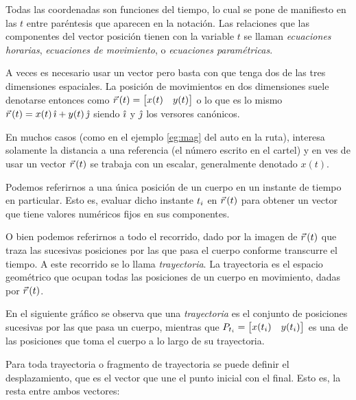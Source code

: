 \documentclass[a5paper,12pt,twoside]{book}
\begin{document}
Todas las coordenadas son funciones del tiempo, lo cual se pone de manifiesto en las $t$ entre paréntesis que aparecen en la notación.
Las relaciones que las componentes del vector posición tienen con la variable $t$ se llaman \emph{ecuaciones horarias}, \emph{ecuaciones de movimiento}, o \emph{ecuaciones paramétricas}.

A veces es necesario usar un vector pero basta con que tenga dos de las tres dimensiones espaciales. La posición de movimientos en dos dimensiones suele denotarse entonces como $\vec{r}\hspace{0.05cm}(t)={ \begin{bmatrix} x(t)&y(t) \end{bmatrix} }$ o lo que es lo mismo $\vec{r}\hspace{0.05cm}(t)=x(t)\,\hat{\imath} + y(t)\,\hat{\jmath}$ siendo $\hat{\imath}$ y $\hat{\jmath}$ los versores canónicos.

En muchos casos (como en el ejemplo \ref{eg:mag} del auto en la ruta), interesa solamente la distancia a una referencia (el número escrito en el cartel) y en ves de usar un vector $\vec{r}\hspace{0.05cm}(t)$ se trabaja con un escalar, generalmente denotado $x(t)$.

Podemos referirnos a una única posición de un cuerpo en un instante de tiempo en particular. Esto es, evaluar dicho instante $t_i$ en $\vec{r}\hspace{0.05cm}(t)$ para obtener un vector que tiene valores numéricos fijos en sus componentes.

O bien podemos referirnos a todo el recorrido, dado por la imagen de $\vec{r}\hspace{0.05cm}(t)$ que traza las sucesivas posiciones por las que pasa el cuerpo conforme transcurre el tiempo. A este recorrido se lo llama \emph{trayectoria}. La trayectoria es el espacio geométrico que ocupan todas las posiciones de un cuerpo en movimiento, dadas por $\vec{r}\hspace{0.05cm}(t)$.

En el siguiente gráfico se observa que una \emph{trayectoria} es el conjunto de posiciones sucesivas por las que pasa un cuerpo, mientras que $P_{t_i}={ \begin{bmatrix} x(t_i)&y(t_i) \end{bmatrix} }$ es una de las posiciones que toma el cuerpo a lo largo de su trayectoria.

\begin{center}
    \vspace{-6cm}
    \def\svgwidth{\linewidth}
    
    \vspace{-6cm}
\end{center}  

Para toda trayectoria o fragmento de trayectoria se puede definir el desplazamiento, que es el vector que une el punto inicial con el final. Esto es, la resta entre ambos vectores:
\end{document}

